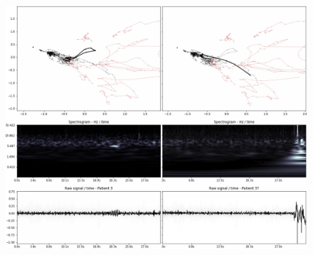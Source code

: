 \begin{figure}[ht]
\centering
\includegraphics[width=\linewidth]{figures/nemo/exp1-337.png}
\caption{}
\label{fig:exp1-337}
\end{figure}


